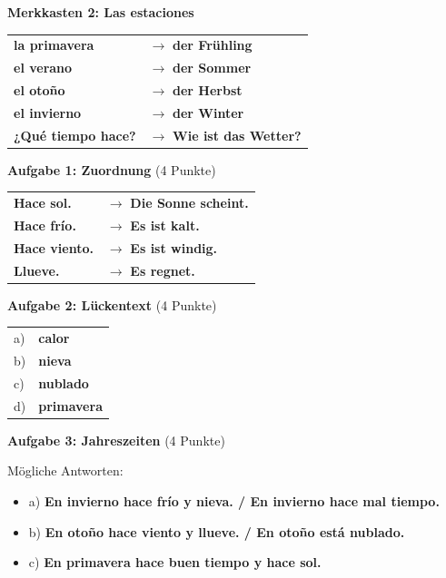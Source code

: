 \documentclass[11pt, a4paper]{article}
\newcommand{\fachfarbe}{spanisch}
\newcommand{\loesung}[1]{\textcolor{loesung}{\textbf{#1}}}
\newcommand{\es}[1]{\textcolor{\fachfarbe}{\textbf{#1}}}
\begin{document}
\vspace{1em}

\textbf{Merkkasten 2: Las estaciones}

\begin{tabular}{ll}
\es{la primavera} & $\rightarrow$ \loesung{der Frühling} \\
\es{el verano} & $\rightarrow$ \loesung{der Sommer} \\
\es{el otoño} & $\rightarrow$ \loesung{der Herbst} \\
\es{el invierno} & $\rightarrow$ \loesung{der Winter} \\
\es{¿Qué tiempo hace?} & $\rightarrow$ \loesung{Wie ist das Wetter?} \\
\end{tabular}

\vspace{1em}

\textbf{Aufgabe 1: Zuordnung} (4 Punkte)

\begin{tabular}{ll}
\es{Hace sol.} & $\rightarrow$ \loesung{Die Sonne scheint.} \\
\es{Hace frío.} & $\rightarrow$ \loesung{Es ist kalt.} \\
\es{Hace viento.} & $\rightarrow$ \loesung{Es ist windig.} \\
\es{Llueve.} & $\rightarrow$ \loesung{Es regnet.} \\
\end{tabular}

\vspace{1em}

\textbf{Aufgabe 2: Lückentext} (4 Punkte)

\begin{tabular}{ll}
a) & \loesung{calor} \\
b) & \loesung{nieva} \\
c) & \loesung{nublado} \\
d) & \loesung{primavera} \\
\end{tabular}

\vspace{1em}

\textbf{Aufgabe 3: Jahreszeiten} (4 Punkte)

Mögliche Antworten:
\begin{itemize}
    \item a) \loesung{En invierno hace frío y nieva. / En invierno hace mal tiempo.}
    \item b) \loesung{En otoño hace viento y llueve. / En otoño está nublado.}
    \item c) \loesung{En primavera hace buen tiempo y hace sol.}
\end{itemize}
\end{document}
